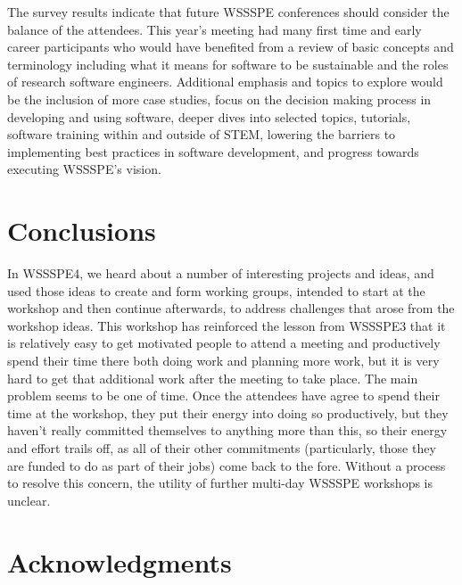 \documentclass[11pt, oneside]{amsart}
\newcommand{\todo}[1]{{\color{blue}$\blacksquare$~\textsf{[TODO: #1]}}}
\begin{document}
The survey results indicate that future WSSSPE conferences should consider the balance of the attendees.
This year's meeting had many first time and early career participants who would have benefited from a review of basic concepts and terminology including what it means for software to be sustainable and the roles of research software engineers.
Additional emphasis and topics to explore would be the inclusion of more case studies, focus on the decision making process in developing and using software, deeper dives into selected topics, tutorials, software training within and outside of STEM, lowering the barriers to implementing best practices in software development, and progress towards executing WSSSPE's vision.

\section{Conclusions} \label{sec:conclusions}

In WSSSPE4, we heard about a number of interesting projects and ideas, and used those
ideas to create and form working groups, intended to start at the workshop and then
continue afterwards, to address challenges that arose from the workshop ideas.  This workshop
has reinforced the lesson from WSSSPE3 that it is relatively easy to get motivated people
to attend a meeting and productively spend their time there both doing work and planning
more work, but it is very hard to get that additional work after the meeting to take place.
The main problem seems to be one of time.  Once the attendees have agree to spend
their time at the workshop, they put their energy into doing so productively, but they haven't
really committed themselves to anything more than this, so their energy and effort trails
off, as all of their other commitments (particularly, those they are funded to do as part of
their jobs) come back to the fore. Without a process to resolve this concern, the utility of
further multi-day WSSSPE workshops is unclear. 



\section*{Acknowledgments} \label{sec:acks}
\end{document}
